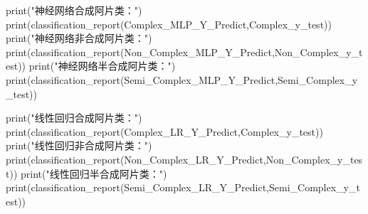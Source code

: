\documentclass[
]{article}
\newenvironment{Shaded}{}{}
\newcommand{\BuiltInTok}[1]{#1}
\newcommand{\NormalTok}[1]{#1}
\newcommand{\StringTok}[1]{\textcolor[rgb]{0.25,0.44,0.63}{#1}}
\begin{document}
\begin{Shaded}
\begin{Highlighting}[]
\BuiltInTok{print}\NormalTok{(}\StringTok{"神经网络合成阿片类："}\NormalTok{)}
\BuiltInTok{print}\NormalTok{(classification\_report(Complex\_MLP\_Y\_Predict,Complex\_y\_test))}
\BuiltInTok{print}\NormalTok{(}\StringTok{"神经网络非合成阿片类："}\NormalTok{)}
\BuiltInTok{print}\NormalTok{(classification\_report(Non\_Complex\_MLP\_Y\_Predict,Non\_Complex\_y\_test))}
\BuiltInTok{print}\NormalTok{(}\StringTok{"神经网络半合成阿片类："}\NormalTok{)}
\BuiltInTok{print}\NormalTok{(classification\_report(Semi\_Complex\_MLP\_Y\_Predict,Semi\_Complex\_y\_test))}

\BuiltInTok{print}\NormalTok{(}\StringTok{"线性回归合成阿片类："}\NormalTok{)}
\BuiltInTok{print}\NormalTok{(classification\_report(Complex\_LR\_Y\_Predict,Complex\_y\_test))}
\BuiltInTok{print}\NormalTok{(}\StringTok{"线性回归非合成阿片类："}\NormalTok{)}
\BuiltInTok{print}\NormalTok{(classification\_report(Non\_Complex\_LR\_Y\_Predict,Non\_Complex\_y\_test))}
\BuiltInTok{print}\NormalTok{(}\StringTok{"线性回归半合成阿片类："}\NormalTok{)}
\BuiltInTok{print}\NormalTok{(classification\_report(Semi\_Complex\_LR\_Y\_Predict,Semi\_Complex\_y\_test))}
\end{Highlighting}
\end{Shaded}
\end{document}
